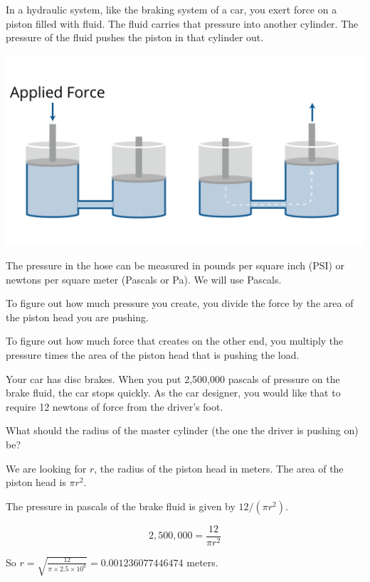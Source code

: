 In a hydraulic system, like the braking system of a car, you exert
force on a piston filled with fluid. The fluid carries that pressure
into another cylinder. The pressure of the fluid pushes the piston in
that cylinder out.

\includegraphics[width=1\textwidth]{hydraulicsNew.png}


The pressure in the hose can be measured in pounds per square inch
(PSI) or newtons per square meter (Pascals or Pa). We will use Pascals.

To figure out how much pressure you create, you divide the force by
the area of the piston head you are pushing.

To figure out how much force that creates on the other end, you
multiply the pressure times the area of the piston head that is
pushing the load.

\begin{Exercise}[title={Hydraulics}, label=hydraulics]

Your car has disc brakes. When you put 2,500,000 pascals of pressure on the
brake fluid, the car stops quickly. As the car designer, you would like
that to require 12 newtons of force from the driver's foot.

What should the radius of the master cylinder (the one the driver is pushing on) be?
\end{Exercise}
\begin{Answer}[ref=hydraulics]
  We are looking for $r$, the radius of the piston head in meters. The area of the piston head is $\pi r^2$.

  The pressure in pascals of the brake fluid is given by $12 / (\pi r^2)$.

  $$2,500,000 = \frac{12}{\pi r^2}$$

  So $r = \sqrt{\frac{12}{\pi \times 2.5 \times 10^6}} = 0.001236077446474$ meters.

\end{Answer}

